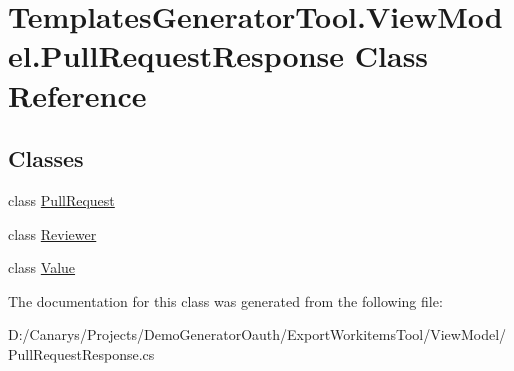 \hypertarget{class_templates_generator_tool_1_1_view_model_1_1_pull_request_response}{}\section{Templates\+Generator\+Tool.\+View\+Model.\+Pull\+Request\+Response Class Reference}
\label{class_templates_generator_tool_1_1_view_model_1_1_pull_request_response}
\subsection*{Classes}
\begin{DoxyCompactItemize}
\item 
class \mbox{\hyperlink{class_templates_generator_tool_1_1_view_model_1_1_pull_request_response_1_1_pull_request}{Pull\+Request}}
\item 
class \mbox{\hyperlink{class_templates_generator_tool_1_1_view_model_1_1_pull_request_response_1_1_reviewer}{Reviewer}}
\item 
class \mbox{\hyperlink{class_templates_generator_tool_1_1_view_model_1_1_pull_request_response_1_1_value}{Value}}
\end{DoxyCompactItemize}


The documentation for this class was generated from the following file\+:\begin{DoxyCompactItemize}
\item 
D\+:/\+Canarys/\+Projects/\+Demo\+Generator\+Oauth/\+Export\+Workitems\+Tool/\+View\+Model/Pull\+Request\+Response.\+cs\end{DoxyCompactItemize}
